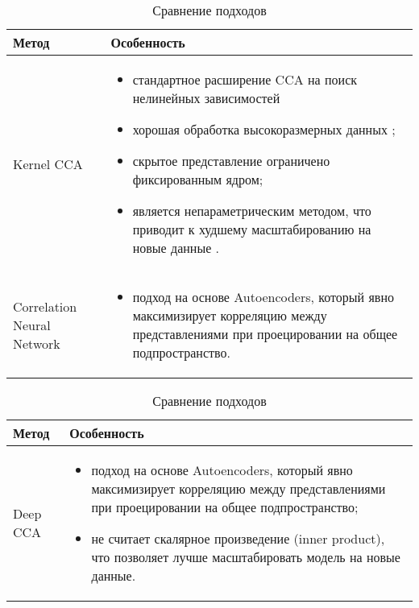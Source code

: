 \documentclass[a4paper,14pt]{article}
\theoremstyle{plain} %
\theoremstyle{definition} %
\theoremstyle{remark} %
\begin{document}
        \begin{table}[h!]
        \centering
        \begin{tabularx}{\textwidth}{|p{3cm}|X|} %
        \hline
        \textbf{Метод} & \textbf{Особенность} \\ \hline
        Kernel CCA &
        \begin{itemize}
        \item стандартное расширение CCA на поиск нелинейных зависимостей
            \item хорошая обработка высокоразмерных данных \citep{biebann2010tempkernelcca};
            \item скрытое представление ограничено фиксированным ядром;
            \item является непараметрическим методом, что приводит к худшему масштабированию на новые данные \citep{andrew2013deepcca}.
        \end{itemize} \\ \hline
        Correlation Neural Network \citep{chandar2016corrnet} &
        \begin{itemize}
            \item подход на основе Autoencoders, который явно максимизирует корреляцию между представлениями при проецировании на общее подпространство.
        \end{itemize} \\ \hline
        \end{tabularx}
        \caption{Сравнение подходов}
        \label{tab:methods_compar1}
        \end{table}
        
        \begin{table}[h!]
        \centering
        \begin{tabularx}{\textwidth}{|p{3cm}|X|} %
        \hline
        \textbf{Метод} & \textbf{Особенность} \\ \hline
        Deep CCA \citep{andrew2013deepcca} & 
        \begin{itemize}
            \item подход на основе Autoencoders, который явно максимизирует корреляцию между представлениями при проецировании на общее подпространство;
            \item не считает скалярное произведение (inner product), что позволяет лучше масштабировать модель на новые данные.
        \end{itemize} \\ \hline
        \end{tabularx}
        \caption{Сравнение подходов}
        \label{tab:methods_compar2}
        \end{table} 
\end{document}

